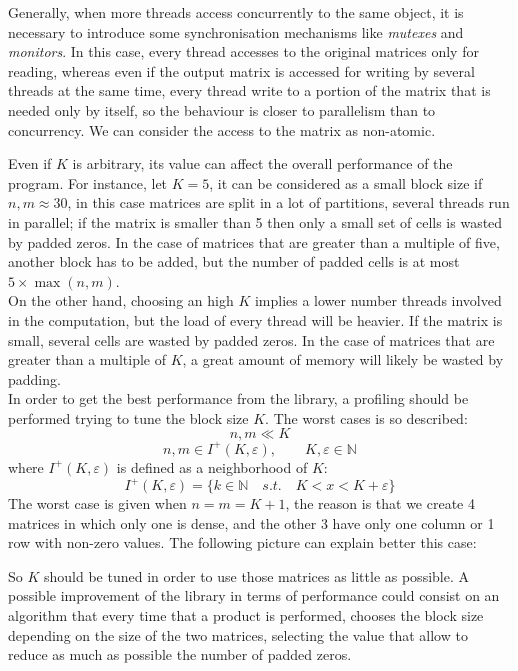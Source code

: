 \documentclass[11pt,a4paper]{article}
\begin{document}
Generally, when more threads access concurrently to the same object, it is necessary
to introduce some synchronisation mechanisms like \textit{mutexes} and 
\textit{monitors}. In this case, every thread accesses to the original matrices
only for reading, whereas even if the output matrix is accessed for writing by several
threads at the same time, every thread write to a portion of the matrix that is
needed only by itself, so the behaviour is closer to parallelism than to concurrency.
We can consider the access to the matrix as non-atomic. 
\par\medskip\noindent
Even if $K$ is arbitrary, its value can affect the overall performance of the
program. For instance, let $K=5$, it can be considered as a small block size if
$n,m\approx 30$, in this case matrices are split in a lot of partitions, several
threads run in parallel; if the matrix is smaller than 5 then only a small set of
cells is wasted by padded zeros. In the case of matrices that are greater than a
multiple of five, another block has to be added, but the number of padded cells is
at most $5\times \max(n,m)$.\\ On the other hand, choosing an high $K$ implies a
lower number threads involved in the computation, but the load of every thread will
be heavier. If the matrix is small, several cells are wasted by padded
zeros. In the case of matrices that are greater than a multiple of $K$, a great amount
of memory will likely be wasted by padding.\\ In order to get the best performance
from the library, a profiling should be performed trying to tune the block size $K$.
The worst cases is so described:
\[
    n,m \ll K    
\]
\[
    n,m\in I^{+}(K,\varepsilon),\qquad K,\varepsilon\in\mathbb{N}
\]
where $I^{+}(K,\varepsilon)$ is defined as a neighborhood of $K$:
\[
    I^{+}(K,\varepsilon)=\{k\in\mathbb{N}\quad \textit{s.t.}\quad K<x<K+\varepsilon\}
\]
The worst case is given when $n = m = K+1$, the reason is that we create 4 matrices in which only one is dense, and the other 3 have only one column or 1 row with non-zero values. The following picture can explain better this case:

\par\medskip\noindent
So $K$ should be tuned in order to use those matrices as little as possible. A possible
improvement of the library in terms of performance could consist on an algorithm that
every time that a product is performed, chooses the block size depending on the size of
the two matrices, selecting the value that allow to reduce as much as possible the
number of padded zeros.
\end{document}
